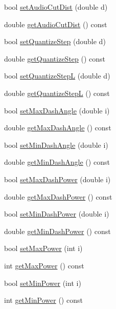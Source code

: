 \begin{DoxyCompactItemize}
bool \hyperlink{classServerSettings_a7f1a933de1014e9bf2a9d8be0a5a5cc6}{set\+Audio\+Cut\+Dist} (double d)
\item 
double \hyperlink{classServerSettings_ad7b512d77e716b591d0d6dc5a627a931}{get\+Audio\+Cut\+Dist} () const 
\item 
bool \hyperlink{classServerSettings_ac1cb48a9ae349637b6e7dc45eaeef2f3}{set\+Quantize\+Step} (double d)
\item 
double \hyperlink{classServerSettings_ad6b874013ad2ca7ff8f006d4879f70bb}{get\+Quantize\+Step} () const 
\item 
bool \hyperlink{classServerSettings_a689b1cfb84757dc65d442a4d30784b1c}{set\+Quantize\+StepL} (double d)
\item 
double \hyperlink{classServerSettings_a80ef9af63c874229e03350406a764084}{get\+Quantize\+StepL} () const 
\item 
bool \hyperlink{classServerSettings_a55b027ac52d259e891c7458c97fb099d}{set\+Max\+Dash\+Angle} (double i)
\item 
double \hyperlink{classServerSettings_a24b8c5c7951c80607c80afc46549090e}{get\+Max\+Dash\+Angle} () const 
\item 
bool \hyperlink{classServerSettings_a90c50bcf172ceda18b69f9a05115c3ac}{set\+Min\+Dash\+Angle} (double i)
\item 
double \hyperlink{classServerSettings_aeb249707f2c5c9f96f4654a4cd61966b}{get\+Min\+Dash\+Angle} () const 
\item 
bool \hyperlink{classServerSettings_a3ece5159bfb4ef0f633d906fe860e1fe}{set\+Max\+Dash\+Power} (double i)
\item 
double \hyperlink{classServerSettings_a74c696e059ba8e5a1a438d51117c2340}{get\+Max\+Dash\+Power} () const 
\item 
bool \hyperlink{classServerSettings_a3c553f2be24816268404aaf37762d87d}{set\+Min\+Dash\+Power} (double i)
\item 
double \hyperlink{classServerSettings_aaabb8e8d476e9afedac6c9f25efeb726}{get\+Min\+Dash\+Power} () const 
\item 
bool \hyperlink{classServerSettings_a9b40833d34c9953a66b8937dbcb3c8ca}{set\+Max\+Power} (int i)
\item 
int \hyperlink{classServerSettings_ab4c1a2b2555a787d60c3a86c725c3230}{get\+Max\+Power} () const 
\item 
bool \hyperlink{classServerSettings_a677d3c1c82893d16531f01de02fb2d1e}{set\+Min\+Power} (int i)
\item 
int \hyperlink{classServerSettings_a95282be2b593377c0bbcdda56041301f}{get\+Min\+Power} () const 

\end{DoxyCompactItemize}
